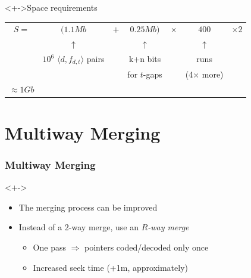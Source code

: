 \documentclass[svgnames]{beamer}
\begin{document}
\begin{frame}
    \begin{exampleblock}<+->{Space requirements}
        \small
        \begin{tabular}{ccccccc}
            $S =$ & $(1.1 Mb$ & $+$ & $0.25Mb)$ & $\times$ & $400$ & $\times 2$\\
            & $\uparrow$ & & $\uparrow$ & & $\uparrow$ \\
            & $10^6$ $\langle d,f_{d,t} \rangle$ pairs& & k+n bits & & runs & \\
            & & &  for $t$-gaps & &  (4$\times$ more) & \\
            \emph{$\approx 1 Gb$}
        \end{tabular}    
    \end{exampleblock}

\end{frame}


\section{Multiway Merging}

\begin{frame}
    \frametitle{Multiway Merging}
    
    \begin{block}<+->{}
        \begin{itemize}
        \item The merging process can be improved
        \item Instead of a 2-way merge, use an \emph{$R$-way merge}
            \begin{itemize}
            \item One pass $\Rightarrow$ pointers coded/decoded only once
            \item Increased seek time (+1m, approximately)
            \end{itemize}
        \end{itemize}
    \end{block}

\end{frame}

\end{document}
